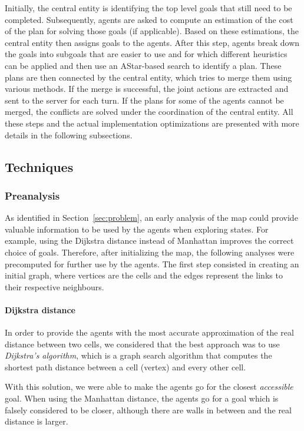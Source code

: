 Initially, the central entity is identifying the top level goals that still need to be completed.
Subsequently, agents are asked to compute an estimation of the cost of the plan for solving those goals (if
applicable). Based on these estimations, the central entity then assigns goals to the agents. After this step,
agents break down the goals into subgoals that are easier to use and for which different heuristics can be
applied and then use an AStar-based search to identify a plan. These plans are then connected by the central
entity, which tries to merge them using various methods. If the merge is successful, the joint actions are
extracted and sent to the server for each turn. If the plans for some of the agents cannot be merged, the
conflicts are solved under the coordination of the central entity. All these steps and the actual
implementation optimizations are presented with more details in the following subsections.


\subsection{Techniques}

\subsubsection{Preanalysis}
As identified in Section~\ref{sec:problem}, an early analysis of the map could provide valuable information to
be used by the agents when exploring states. For example, using the Dijkstra distance instead of Manhattan
improves the correct choice of goals. Therefore, after initializing the map, the following analyses were
precomputed for further use by the agents. The first step consisted in creating an initial graph, where
vertices are the cells and the edges represent the links to their respective neighbours.

\paragraph{Dijkstra distance}

In order to provide the agents with the most accurate approximation of the real distance between two cells, we
considered that the best approach was to use \textit{Dijkstra's algorithm}, which is a graph search algorithm
that computes the shortest path distance between a cell (vertex) and every other cell.

With this solution, we were able to make the agents go for the closest \textit{accessible} goal. When using
the Manhattan distance, the agents go for a goal which is falsely considered to be closer, although there are
walls in between and the real distance is larger.

